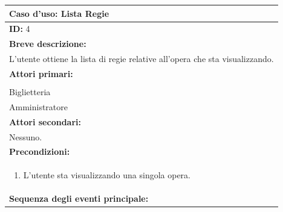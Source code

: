 \documentclass{article}
\begin{document}
                \begin{table}[H]
                    \begin{tabular}{|p{\linewidth}|}
                        \hline
                        \cellcolor{gray!100}
                        \color{white}
                        \centerline{\textbf{Caso d'uso:} Lista Regie} \\
                        \hline
                        \textbf{ID:} 4 \\
                        \hline
                        \cellcolor{gray!20}
                        \textbf{Breve descrizione:} \\
                        \cellcolor{gray!20}
                        L'utente ottiene la lista di regie relative all'opera che sta visualizzando. \\
                        \hline
                        \textbf{Attori primari:} \\
                        \begin{minipage}{\linewidth}
                            Cliente \\
                            Biglietteria \\
                            Amministratore
                        \end{minipage}
                        \vspace{0pt} \\ %
                        \hline
                        \textbf{Attori secondari:} \\
                        Nessuno. \\
                        \hline
                        \cellcolor{gray!20}
                        \textbf{Precondizioni:} \\
                        \cellcolor{gray!20}
                        \begin{minipage}{\linewidth}
                            \begin{enumerate}
                                \item L'utente sta visualizzando una singola opera.
                            \end{enumerate}
                        \end{minipage} \\
                        \hline
                        \textbf{Sequenza degli eventi principale:}

\end{tabular}
\end{table}
\end{document}
